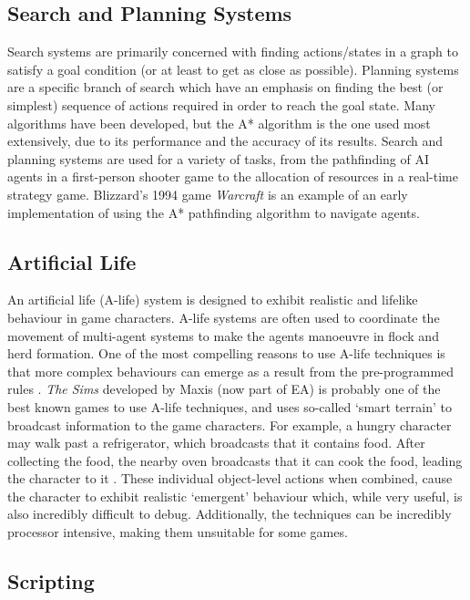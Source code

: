 \documentclass[a4paper,oneside]{report}
\begin{document}
\subsection{Search and Planning Systems} 

Search systems are primarily concerned with finding actions/states in a graph to satisfy a goal condition (or at least to get as close as possible). Planning systems are a specific branch of search which have an emphasis on finding the best (or simplest) sequence of actions required in order to reach the goal state. Many algorithms have been developed, but the A* algorithm is the one used most extensively, due to its performance and the accuracy of its results. Search and planning systems are used for a variety of tasks, from the pathfinding of AI agents in a first-person shooter game to the allocation of resources in a real-time strategy game. Blizzard's 1994 game \emph{Warcraft} is an example of an early implementation of using the A* pathfinding algorithm to navigate agents.

\subsection{Artificial Life} 

An artificial life (A-life) system is designed to exhibit realistic and lifelike behaviour in game characters. A-life systems are often used to coordinate the movement of multi-agent systems to make the agents manoeuvre in flock and herd formation. One of the most compelling reasons to use A-life techniques is that more complex behaviours can emerge as a result from the pre-programmed rules \cite{Woodcock:bs}. \emph{The Sims} developed by Maxis (now part of EA) is probably one of the best known games to use A-life techniques, and uses so-called `smart terrain' to broadcast information to the game characters. For example, a hungry character may walk past a refrigerator, which broadcasts that it contains food. After collecting the food, the nearby oven broadcasts that it can cook the food, leading the character to it \cite{Woodcock:bs}. These individual object-level actions when combined, cause the character to exhibit realistic `emergent' behaviour which, while very useful, is also incredibly difficult to debug. Additionally, the techniques can be incredibly processor intensive, making them unsuitable for some games. 

\subsection{Scripting} 
\end{document}
